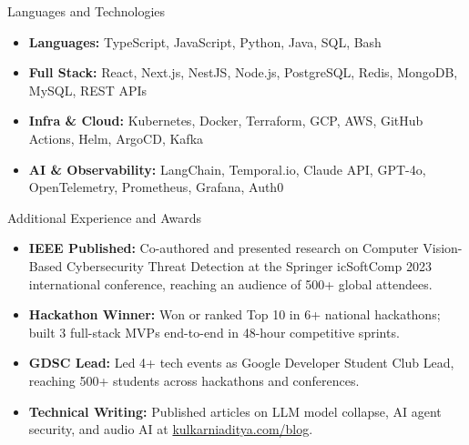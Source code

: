 \documentclass[]{mcdowellcv}
\begin{document}
\begin{cvsection}{Languages and Technologies}
  \begin{cvsubsection}{}{}{}
    \begin{itemize}
      \item \textbf{Languages:} TypeScript, JavaScript, Python, Java, SQL, Bash
      \item \textbf{Full Stack:} React, Next.js, NestJS, Node.js, PostgreSQL, Redis, MongoDB, MySQL, REST APIs
      \item \textbf{Infra \& Cloud:} Kubernetes, Docker, Terraform, GCP, AWS, GitHub Actions, Helm, ArgoCD, Kafka
      \item \textbf{AI \& Observability:} LangChain, Temporal.io, Claude API, GPT-4o, OpenTelemetry, Prometheus, Grafana, Auth0
    \end{itemize}
  \end{cvsubsection}
\end{cvsection}

\begin{cvsection}{Additional Experience and Awards}
  \begin{cvsubsection}{}{}{}
    \begin{itemize}
      \item \textbf{IEEE Published:} Co-authored and presented research on Computer Vision-Based Cybersecurity Threat Detection at the Springer icSoftComp 2023 international conference, reaching an audience of 500+ global attendees.
      \item \textbf{Hackathon Winner:} Won or ranked Top 10 in 6+ national hackathons; built 3 full-stack MVPs end-to-end in 48-hour competitive sprints.
      \item \textbf{GDSC Lead:} Led 4+ tech events as Google Developer Student Club Lead, reaching 500+ students across hackathons and conferences.
      \item \textbf{Technical Writing:} Published articles on LLM model collapse, AI agent security, and audio AI at \href{https://www.kulkarniaditya.com/blog}{kulkarniaditya.com/blog}.
    \end{itemize}
  \end{cvsubsection}
\end{cvsection}
\end{document}
